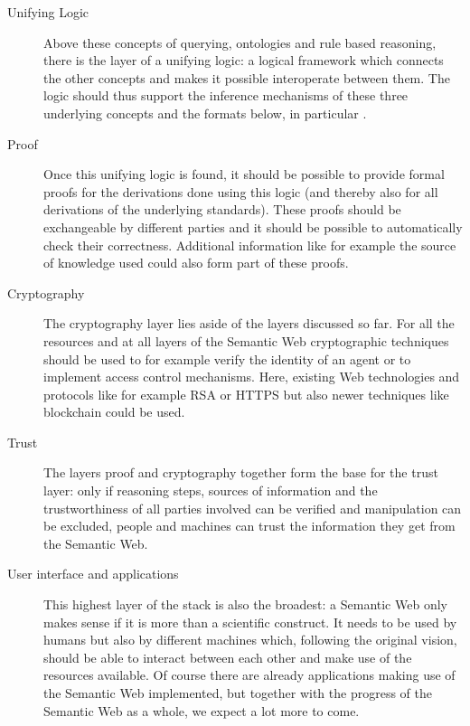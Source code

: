 \begin{description}
 \item[Unifying Logic]
 Above these concepts of querying, ontologies and rule based reasoning, there is the layer of a unifying logic: 
 a logical framework which connects the other concepts and makes it possible interoperate between them. 
The logic should thus support the inference mechanisms of these three underlying concepts and the formats below, in particular \rdf.
 \item[Proof]
 Once this unifying logic is found, it should be possible to provide formal proofs for the derivations done using this logic (and thereby also for all derivations of the underlying standards). 
 These proofs should be exchangeable by different parties and it should be possible to automatically check their correctness. Additional information like for example the source of knowledge 
 used could also form part
 of these proofs.
 \item[Cryptography]
 The cryptography layer lies aside of the layers discussed so far. For all the resources and at all layers of the Semantic Web cryptographic techniques should be used 
 to for example verify the identity of an agent or to implement access control mechanisms. Here, existing Web technologies and protocols like for example RSA or HTTPS but 
 also newer techniques like blockchain could be used.
 \item[Trust]
 The layers proof and cryptography together form the base for the trust layer: only if reasoning steps, sources of information and the trustworthiness of all parties involved
 can be verified and manipulation 
 can be excluded, people and machines can trust the information they get from the Semantic Web.
 \item[User interface and applications]
 This highest layer of the stack is also the broadest: a Semantic Web only makes sense if it is more than a scientific construct. 
 It needs to be used by humans but also by different machines which, following
 the original vision, should be able to interact between each other and make use of the resources available. Of course there are already applications making use of the Semantic Web implemented, but
 together with the progress of the Semantic Web as a whole, we expect a lot more to come.
\end{description}

